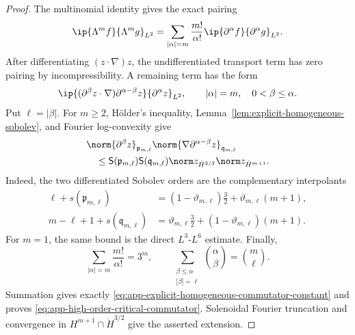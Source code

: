 \begin{proof}
The multinomial identity gives the exact pairing
\[
 \ip{\Lambda^mf}{\Lambda^mg}_{L^2}
 =
 \sum_{|\alpha|=m}\frac{m!}{\alpha!}
 \ip{\partial^\alpha f}{\partial^\alpha g}_{L^2}.
\]
After differentiating \((z\cdot\nabla)z\), the undifferentiated transport
term has zero pairing by incompressibility.  A remaining term has the form
\[
 \ip{(\partial^\beta z\cdot\nabla)
          \partial^{\alpha-\beta}z}
      {\partial^\alpha z}_{L^2},
 \qquad
 |\alpha|=m,\quad 0<\beta\le\alpha.
\]
Put \(\ell=|\beta|\).  For \(m\ge2\), H\"older's inequality,
Lemma~\ref{lem:explicit-homogeneous-sobolev}, and Fourier log-convexity give
\begin{align*}
 &\norm{\partial^\beta z}_{\mathfrak p_{m,\ell}}
 \norm{\nabla\partial^{\alpha-\beta}z}_{\mathfrak q_{m,\ell}}\\
 &\quad\le
 \mathsf S(\mathfrak p_{m,\ell})
 \mathsf S(\mathfrak q_{m,\ell})
 \norm z_{\dot H^{3/2}}\norm z_{\dot H^{m+1}}.
\end{align*}
Indeed, the two differentiated Sobolev orders are the complementary
interpolants
\begin{align*}
 \ell+s(\mathfrak p_{m,\ell})
 &=(1-\vartheta_{m,\ell})\frac32
   +\vartheta_{m,\ell}(m+1),\\
 m-\ell+1+s(\mathfrak q_{m,\ell})
 &=\vartheta_{m,\ell}\frac32
   +(1-\vartheta_{m,\ell})(m+1).
\end{align*}
For \(m=1\), the same bound is the direct \(L^3\)-\(L^6\) estimate.
Finally,
\[
 \sum_{|\alpha|=m}\frac{m!}{\alpha!}=3^m,
 \qquad
 \sum_{\substack{\beta\le\alpha\\|\beta|=\ell}}
 \binom\alpha\beta=\binom m\ell.
\]
Summation gives exactly
\eqref{eq:app-explicit-homogeneous-commutator-constant} and proves
\eqref{eq:app-high-order-critical-commutator}.
Solenoidal Fourier truncation and convergence in
\(H^{m+1}\cap\dot H^{3/2}\) give the asserted extension.
\end{proof}

